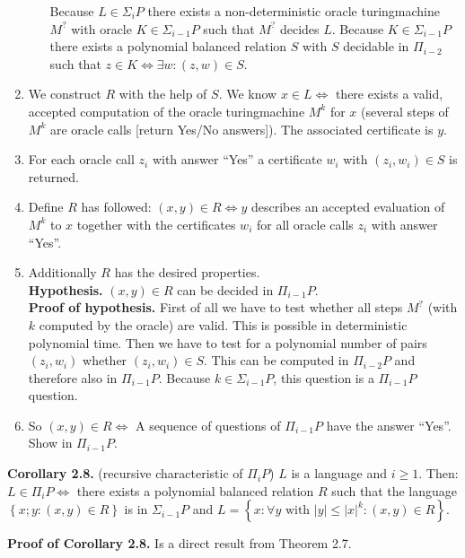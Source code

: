 \documentclass[a4paper]{article}
\newcommand{\card}[1]{|#1|}
\newcommand{\set}[1]{\left\{#1\right\}}
\begin{document}
\begin{enumerate}
\begin{itemize}
        Because $L \in \Sigma_i P$ there exists a non-deterministic oracle
        turingmachine $M^?$ with oracle $K \in \Sigma_{i-1} P$ such that
        $M^?$ decides $L$.
        Because $K \in \Sigma_{i-1} P$ there exists a polynomial balanced
        relation $S$ with $S$ decidable in $\Pi_{i-2}$ such that
        $z \in K \Leftrightarrow \exists w: (z, w) \in S$.
    \end{itemize}
  \item We construct $R$ with the help of $S$. We know $x \in L
        \Leftrightarrow$ there exists a valid, accepted computation of
        the oracle turingmachine $M^k$ for $x$ (several steps of $M^k$
        are oracle calls [return Yes/No answers]).
        The associated certificate is $y$.
  \item For each oracle call $z_i$ with answer ``Yes'' a certificate $w_i$
        with $(z_i, w_i) \in S$ is returned.
  \item Define $R$ has followed: $(x, y) \in R \Leftrightarrow y$ describes
        an accepted evaluation of $M^k$ to $x$ together with the certificates
        $w_i$ for all oracle calls $z_i$ with answer ``Yes''.
  \item Additionally $R$ has the desired properties. \\
        \textbf{Hypothesis.} $(x, y) \in R$ can be decided in $\Pi_{i-1} P$. \\
        \textbf{Proof of hypothesis.}
        First of all we have to test whether all steps $M^?$ (with $k$ computed
        by the oracle) are valid. This is possible in deterministic polynomial time.
        Then we have to test for a polynomial number of pairs $(z_i, w_i)$
        whether $(z_i, w_i) \in S$. This can be computed in $\Pi_{i-2} P$ and
        therefore also in $\Pi_{i-1} P$. Because $k \in \Sigma_{i-1} P$, this
        question is a $\Pi_{i-1} P$ question.
  \item So $(x, y) \in R \Leftrightarrow$ A sequence of questions of $\Pi_{i-1} P$
        have the answer ``Yes''. Show in $\Pi_{i-1} P$.
\end{enumerate}

\textbf{Corollary 2.8.} (recursive characteristic of $\Pi_i P$)
$L$ is a language and $i \geq 1$. Then:
$L \in \Pi_i P \Leftrightarrow $ there exists a polynomial balanced relation $R$
such that the language $\set{x;y: (x, y) \in R}$ is in $\Sigma_{i-1} P$ and
$L = \set{x: \forall y \text{ with } \card{y} \leq \card{x}^k: (x, y) \in R}$.

\textbf{Proof of Corollary 2.8.} Is a direct result from Theorem 2.7.
\end{document}
